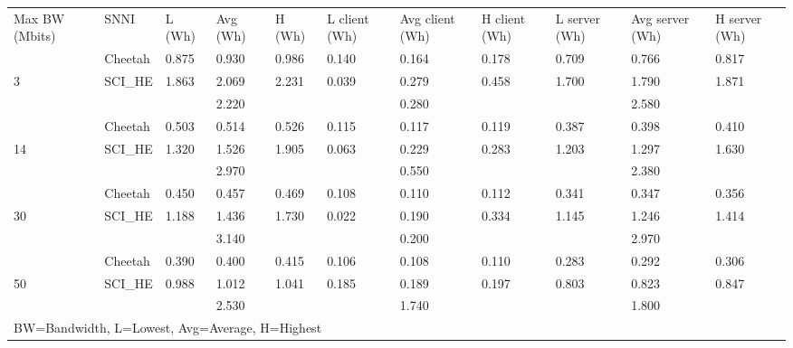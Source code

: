 \begin{tabular}{lllllllllll}
Max BW (Mbits) & SNNI    & L (Wh) & Avg (Wh) & H (Wh) & L client (Wh) & Avg client (Wh) & H client (Wh) & L server (Wh) & Avg server (Wh) & H server (Wh) \\
               & Cheetah & 0.875  & 0.930    & 0.986  & 0.140         & 0.164           & 0.178         & 0.709         & 0.766           & 0.817         \\
3              & SCI\_HE & 1.863  & 2.069    & 2.231  & 0.039         & 0.279           & 0.458         & 1.700         & 1.790           & 1.871         \\
               &         &        & 2.220    &        &               & 0.280           &               &               & 2.580           &               \\
               & Cheetah & 0.503  & 0.514    & 0.526  & 0.115         & 0.117           & 0.119         & 0.387         & 0.398           & 0.410         \\
14             & SCI\_HE & 1.320  & 1.526    & 1.905  & 0.063         & 0.229           & 0.283         & 1.203         & 1.297           & 1.630         \\
               &         &        & 2.970    &        &               & 0.550           &               &               & 2.380           &               \\
               & Cheetah & 0.450  & 0.457    & 0.469  & 0.108         & 0.110           & 0.112         & 0.341         & 0.347           & 0.356         \\
30             & SCI\_HE & 1.188  & 1.436    & 1.730  & 0.022         & 0.190           & 0.334         & 1.145         & 1.246           & 1.414         \\
               &         &        & 3.140    &        &               & 0.200           &               &               & 2.970           &               \\
               & Cheetah & 0.390  & 0.400    & 0.415  & 0.106         & 0.108           & 0.110         & 0.283         & 0.292           & 0.306         \\
50             & SCI\_HE & 0.988  & 1.012    & 1.041  & 0.185         & 0.189           & 0.197         & 0.803         & 0.823           & 0.847         \\
               &         &        & 2.530    &        &               & 1.740           &               &               & 1.800           &               \\
\multicolumn{11}{l}{BW=Bandwidth, L=Lowest, Avg=Average, H=Highest}                                                                                      
\end{tabular}